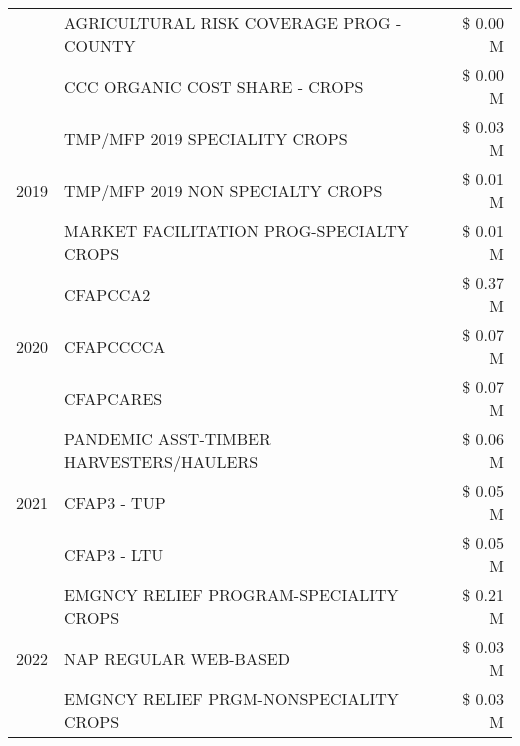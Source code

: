\begin{tabular}{llr}
 & AGRICULTURAL RISK COVERAGE PROG - COUNTY & \$ 0.00 M \\
 & CCC ORGANIC COST SHARE - CROPS & \$ 0.00 M \\
\cline{1-3}
\multirow[t]{3}{*}{2019} & TMP/MFP 2019 SPECIALITY CROPS & \$ 0.03 M \\
 & TMP/MFP 2019 NON SPECIALTY CROPS & \$ 0.01 M \\
 & MARKET FACILITATION PROG-SPECIALTY CROPS & \$ 0.01 M \\
\cline{1-3}
\multirow[t]{3}{*}{2020} & CFAPCCA2 & \$ 0.37 M \\
 & CFAPCCCCA & \$ 0.07 M \\
 & CFAPCARES & \$ 0.07 M \\
\cline{1-3}
\multirow[t]{3}{*}{2021} & PANDEMIC ASST-TIMBER HARVESTERS/HAULERS & \$ 0.06 M \\
 & CFAP3 - TUP & \$ 0.05 M \\
 & CFAP3 - LTU & \$ 0.05 M \\
\cline{1-3}
\multirow[t]{3}{*}{2022} & EMGNCY RELIEF PROGRAM-SPECIALITY CROPS & \$ 0.21 M \\
 & NAP REGULAR WEB-BASED & \$ 0.03 M \\
 & EMGNCY RELIEF PRGM-NONSPECIALITY CROPS & \$ 0.03 M \\
\cline{1-3}
\bottomrule
\end{tabular}
